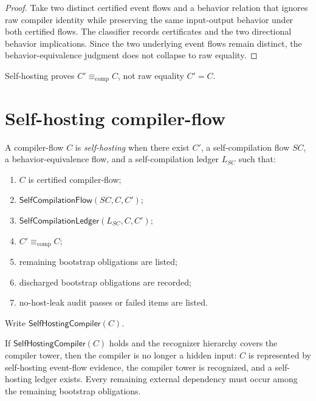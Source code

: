 \begin{proof}
Take two distinct certified event flows and a behavior relation that ignores raw compiler identity while preserving the same input-output behavior under both certified flows. The classifier records certificates and the two directional behavior implications. Since the two underlying event flows remain distinct, the behavior-equivalence judgment does not collapse to raw equality.
\end{proof}

\begin{corollary}
\label{cor:self-hosting-behavior-level-stability}
Self-hosting proves $C'\equiv_{\mathrm{comp}}C$, not raw equality $C'=C$.
\end{corollary}

\section{Self-hosting compiler-flow}
\label{sec:self-hosting-compiler-flow}

\begin{definition}
\label{def:self-hosting-p9-compiler-flow}
A compiler-flow $C$ is \emph{self-hosting} when there exist $C'$, a self-compilation flow $SC$, a behavior-equivalence flow, and a self-compilation ledger $L_{SC}$ such that:
\begin{enumerate}
\item $C$ is certified compiler-flow;
\item $\mathsf{SelfCompilationFlow}(SC,C,C')$;
\item $\mathsf{SelfCompilationLedger}(L_{SC},C,C')$;
\item $C'\equiv_{\mathrm{comp}}C$;
\item remaining bootstrap obligations are listed;
\item discharged bootstrap obligations are recorded;
\item no-host-leak audit passes or failed items are listed.
\end{enumerate}
Write $\mathsf{SelfHostingCompiler}(C)$.
\end{definition}

\begin{theorem}
\label{thm:self-hosting-removes-hidden-compiler}
If $\mathsf{SelfHostingCompiler}(C)$ holds and the recognizer hierarchy covers the compiler tower, then the compiler is no longer a hidden input: $C$ is represented by self-hosting event-flow evidence, the compiler tower is recognized, and a self-hosting ledger exists. Every remaining external dependency must occur among the remaining bootstrap obligations.
\end{theorem}

